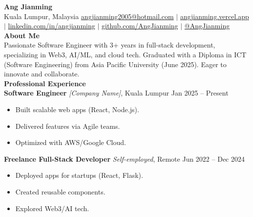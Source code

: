 \documentclass[a4paper,10pt]{article}
\begin{document}
\pagestyle{empty}

\begin{multicols}{2}
    \setlength{\columnsep}{10pt} %
    \raggedcolumns %

    \noindent
    {\LARGE \textbf{Ang Jianming}} \\[2pt]
    Kuala Lumpur, Malaysia \hfill
    \href{mailto:angjianming2005@hotmail.com}{angjianming2005@hotmail.com} $\vert$
    \href{https://angjianming.vercel.app/}{angjianming.vercel.app} $\vert$
    \href{https://linkedin.com/in/angjianming}{linkedin.com/in/angjianming} $\vert$
    \href{https://github.com/AngJianming}{github.com/AngJianming} $\vert$
    \href{https://twitter.com/AngJianming}{@AngJianming} \\[2pt]

    \textbf{About Me} \\
    Passionate Software Engineer with 3+ years in full-stack development, specializing in Web3, AI/ML, and cloud tech. Graduated with a Diploma in ICT (Software Engineering) from Asia Pacific University (June 2025). Eager to innovate and collaborate. \\[2pt]

    \textbf{Professional Experience} \\
    \textbf{Software Engineer} \textit{[Company Name]}, Kuala Lumpur \hfill Jan 2025 -- Present \\
    \begin{itemize}[leftmargin=*,nosep]
        \item Built scalable web apps (React, Node.js).
        \item Delivered features via Agile teams.
        \item Optimized with AWS/Google Cloud.
    \end{itemize}

    \textbf{Freelance Full-Stack Developer} \textit{Self-employed}, Remote \hfill Jun 2022 -- Dec 2024 \\
    \begin{itemize}[leftmargin=*,nosep]
        \item Deployed apps for startups (React, Flask).
        \item Created reusable components.
        \item Explored Web3/AI tech.
    \end{itemize}


\end{multicols}
\end{document}
